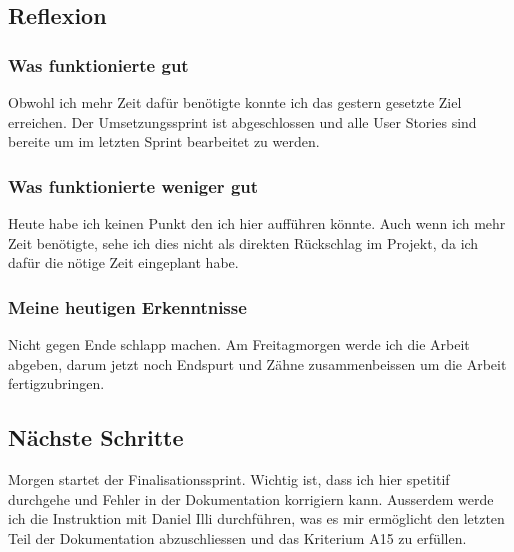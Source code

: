 \subsection*{Reflexion}

\subsubsection*{Was funktionierte gut}
Obwohl ich mehr Zeit dafür benötigte konnte ich das gestern gesetzte Ziel erreichen. Der Umsetzungssprint ist
abgeschlossen und alle User Stories sind bereite um im letzten Sprint bearbeitet zu werden.

\subsubsection*{Was funktionierte weniger gut}
Heute habe ich keinen Punkt den ich hier aufführen könnte. Auch wenn ich mehr Zeit benötigte, sehe ich dies
nicht als direkten Rückschlag im Projekt, da ich dafür die nötige Zeit eingeplant habe.

\subsubsection*{Meine heutigen Erkenntnisse}
Nicht gegen Ende schlapp machen. Am Freitagmorgen werde ich die Arbeit abgeben, darum jetzt noch Endspurt und 
Zähne zusammenbeissen um die Arbeit fertigzubringen.

\subsection*{Nächste Schritte}
Morgen startet der Finalisationssprint. Wichtig ist, dass ich hier spetitif durchgehe und Fehler in der Dokumentation korrigiern kann.
Ausserdem werde ich die Instruktion mit Daniel Illi durchführen, was es mir ermöglicht den letzten Teil der Dokumentation abzuschliessen und das 
Kriterium A15 zu erfüllen.

\pagebreak
